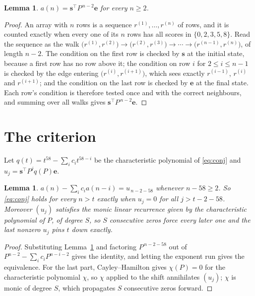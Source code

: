 \documentclass[11pt,a4paper]{article}
\theoremstyle{plain}
\newtheorem{lemma}[theorem]{Lemma}
\theoremstyle{definition}
\begin{document}
\begin{lemma}\label{lem:walk}
$a(n)=\mathbf{s}^{\!\top}P^{\,n-2}\mathbf{e}$ for every $n\ge2$.
\end{lemma}

\begin{proof}
An array with $n$ rows is a sequence $r^{(1)},\dots,r^{(n)}$ of rows, and it is counted
exactly when every one of its $n$ rows has all scores in $\{0,2,3,5,8\}$. Read the sequence as the
walk $\bigl(r^{(1)},r^{(2)}\bigr)\to\bigl(r^{(2)},r^{(3)}\bigr)\to\cdots\to
\bigl(r^{(n-1)},r^{(n)}\bigr)$, of length $n-2$. The condition on the first row is
checked by $\mathbf{s}$ at the initial state, because a first row has no row above it; the
condition on row $i$ for $2\le i\le n-1$ is checked by the edge entering
$\bigl(r^{(i)},r^{(i+1)}\bigr)$, which sees exactly $r^{(i-1)}$, $r^{(i)}$ and
$r^{(i+1)}$; and the condition on the last row is checked by $\mathbf{e}$ at the final
state. Each row's condition is therefore tested once and with the correct neighbours, and
summing over all walks gives $\mathbf{s}^{\!\top}P^{\,n-2}\mathbf{e}$.
\end{proof}

\section{The criterion}

Let $q(t)=t^{58}-\sum_i c_i t^{58-i}$ be the characteristic polynomial of
\eqref{eq:conj} and $u_j=\mathbf{s}^{\!\top}P^{j}q(P)\mathbf{e}$.

\begin{lemma}\label{lem:crit}
$a(n)-\sum_i c_i a(n-i)=u_{\,n-2-58}$ whenever $n-58\ge2$. So \eqref{eq:conj}
holds for every $n>t$ exactly when $u_j=0$ for all $j>t-2-58$. Moreover $(u_j)$
satisfies the monic linear recurrence given by the characteristic polynomial of $P$, of
degree $S$, so $S$ consecutive zeros force every later one and the last nonzero $u_j$ pins
$t$ down exactly.
\end{lemma}

\begin{proof}
Substituting Lemma~\ref{lem:walk} and factoring $P^{\,n-2-58}$ out of
$P^{n-2}-\sum_i c_i P^{n-i-2}$ gives the identity, and letting the exponent run gives the
equivalence. For the last part, Cayley--Hamilton gives $\chi(P)=0$ for the characteristic
polynomial $\chi$, so $\chi$ applied to the shift annihilates $(u_j)$; $\chi$ is monic of
degree $S$, which propagates $S$ consecutive zeros forward.
\end{proof}
\end{document}
